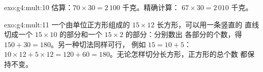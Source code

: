 \begin{solution}{exo:g4:mult:10}
估算：$70 \times 30 = 2\,100$ 千克。精确计算：
$67 \times 30 = 2\,010$ 千克。
\end{solution}

\begin{solution}{exo:g4:mult:11}
一个由单位正方形组成的 $15 \times 12$ 长方形，可以用一条竖直的
直线切成一个 $15 \times 10$ 的部分和一个 $15 \times 2$ 的部分：分别数出
各部分的个数，得 $150 + 30 = 180$。另一种切法同样可行，
例如 $15 = 10 + 5$：$10 \times 12 + 5 \times 12 = 120 + 60
= 180$。无论怎样切分长方形，正方形的总个数
都保持不变。
\end{solution}
